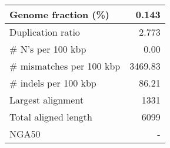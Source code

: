 \documentclass[12pt,a4paper]{article}
\begin{document}
\begin{table}[ht]
\begin{center}
\begin{tabular}{|l*{1}{|r}|}
Genome fraction (\%) & 0.143 \\ \hline
Duplication ratio & 2.773 \\ \hline
\# N's per 100 kbp & 0.00 \\ \hline
\# mismatches per 100 kbp & 3469.83 \\ \hline
\# indels per 100 kbp & 86.21 \\ \hline
Largest alignment & 1331 \\ \hline
Total aligned length & 6099 \\ \hline
NGA50 & - \\ \hline
\end{tabular}
\end{center}
\end{table}
\end{document}
